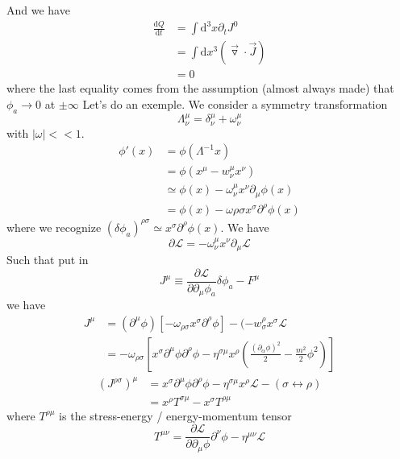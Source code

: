 \documentclass[a4paper]{book}
\theoremstyle{definition}
\theoremstyle{remark}
\begin{document}
And we have 
\begin{equation}
    \begin{aligned}
        \frac{\text{d}Q}{\text{d}t} &= \int \text{d}^3 x \partial_t J^0 \\
        &= \int \text{d}x^3 (\vec{\triangledown} \cdot \vec{J})\\
        &= 0
    \end{aligned}
\end{equation}
where the last equality comes from the assumption (almost always made) that $\phi_a \rightarrow 0$ at $\pm \infty$
Let's do an exemple. We consider a symmetry transformation 
\begin{equation}
    \Lambda^\mu_\nu = \delta^\mu_\nu + \omega^\mu_\nu
\end{equation}
with $|\omega| << 1$. 
\begin{equation}
    \begin{aligned}
        \phi'(x) &= \phi(\Lambda^{-1}x) \\
        &= \phi(x^\mu - w^\mu_\nu x^\nu) \\
        &\simeq \phi(x) - \omega ^\mu_\nu x^\nu \partial_\mu \phi(x) \\
        &= \phi(x) - \omega {\rho\sigma} x^\sigma \partial^\rho \phi(x) 
    \end{aligned}
\end{equation}
where we recognize $(\delta \phi_a)^{\rho\sigma} \simeq x^\sigma \partial^\rho \phi(x)$. 
We have 
\begin{equation}
    \partial \mathcal{L} = -\omega^\mu_\nu x^\nu \partial_\mu \mathcal{L}
\end{equation}
Such that put in 
\begin{equation}
    J^\mu \equiv \frac{\partial \mathcal{L}}{\partial \partial_\mu \phi_a} \delta\phi_a - F^\mu 
\end{equation}
we have 
\begin{equation}
    \begin{aligned}
        J^\mu &= (\partial^\mu\phi )[-\omega_{\rho\sigma}x^\sigma \partial^\rho \phi] - (-w^\rho_\sigma x^\sigma \mathcal{L} \\
        &= -\omega_{\rho\sigma} \left[x^\sigma \partial^\mu \phi \partial^\rho \phi - \eta^{\sigma\mu}x^\rho\left(\frac{(\partial_\alpha \phi)^2}{2} - \frac{m^2}{2}\phi^2\right)\right]
    \end{aligned}
\end{equation}
\begin{equation}
    \begin{aligned}
        \left(J^{\rho\sigma}\right)^\mu &= x^\sigma \partial^\mu \phi \partial^\rho \phi - \eta^{\sigma\mu}x^\rho\mathcal{L} - (\sigma \leftrightarrow \rho) \\
        &= x^\rho T^{\sigma \mu} - x^\sigma T^{\rho \mu}
    \end{aligned}
\end{equation}
where $T^{\rho\mu}$ is the stress-energy / energy-momentum tensor
\begin{equation}
    T^{\mu\nu} = \frac{\partial \mathcal{L}}{\partial \partial_\mu \phi} \partial^\nu \phi - \eta^{\mu\nu}\mathcal{L}
\end{equation}
\end{document}
